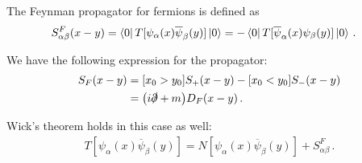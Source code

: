 \documentclass[main.tex]{subfiles}
\begin{document}
\begin{definition}
The Feynman propagator for fermions is defined as 
%
\begin{align}
S^{F}_{\alpha \beta } (x-y)
&= \bra{0}T[\psi_{\alpha }(x) \overline{\psi}_{\beta }(y)] \ket{0}
= - \bra{0} T[\overline{\psi}_\alpha (x) \psi_{\beta }(y)] \ket{0}
\,.
\end{align}
\end{definition}

\begin{claim}
We have the following expression for the propagator: 
%
\begin{align}
S_F(x-y) &= [x_0 > y_0 ] S_+ (x-y) - [x_0 < y_0 ] S_- (x-y)  \\
&= \qty(i \slashed{\partial} + m) D_F (x-y)
\,.
\end{align}
\end{claim}


\begin{claim}
Wick's theorem holds in this case as well: 
%
\begin{align}
T[\psi_{\alpha }(x) \overline{\psi}_{\beta }(y)]
= N [\psi_{\alpha }(x) \overline{\psi}_{\beta }(y)]
+ S^{F}_{\alpha \beta }
\,.
\end{align}
\end{claim}
\end{document}
